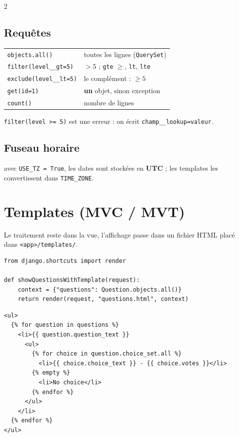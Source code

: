 \documentclass[a4paper,10pt]{article}
\newcommand{\co}[1]{\texttt{\textcolor{codefg}{#1}}}
\begin{document}
\begin{multicols}{2}
\subsection{Requêtes}
\begin{tabularx}{\linewidth}{@{}l>{\raggedright\arraybackslash}X@{}}
\toprule
\co{objects.all()}             & toutes les lignes (\co{QuerySet}) \\
\co{filter(level\_\_gt=5)}     & $>5$ ; \co{gte} $\geq$, \co{lt}, \co{lte} \\
\co{exclude(level\_\_lt=5)}    & le complément : $\geq 5$ \\
\co{get(id=1)}                 & \textbf{un} objet, sinon exception \\
\co{count()}                   & nombre de lignes \\
\bottomrule
\end{tabularx}

\vspace{0.3em}
\co{filter(level >= 5)} est une erreur : on écrit \co{champ\_\_lookup=valeur}.

\subsection{Fuseau horaire} avec \co{USE\_TZ = True}, les dates sont
stockées en \textbf{UTC} ; les templates les convertissent dans
\co{TIME\_ZONE}.

\section{Templates (MVC / MVT)}

Le traitement reste dans la vue, l'affichage passe dans un fichier HTML
placé dans \co{<app>/templates/}.

\begin{lstlisting}
from django.shortcuts import render

def showQuestionsWithTemplate(request):
    context = {"questions": Question.objects.all()}
    return render(request, "questions.html", context)
\end{lstlisting}

\begin{lstlisting}
<ul>
  {% for question in questions %}
    <li>{{ question.question_text }}
      <ul>
        {% for choice in question.choice_set.all %}
          <li>{{ choice.choice_text }} - {{ choice.votes }}</li>
        {% empty %}
          <li>No choice</li>
        {% endfor %}
      </ul>
    </li>
  {% endfor %}
</ul>
\end{lstlisting}


\end{multicols}
\end{document}
